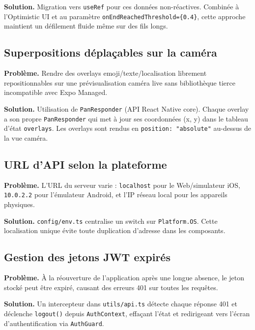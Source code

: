 \textbf{Solution.} Migration vers \texttt{useRef} pour ces données non-réactives. Combinée à l'Optimistic UI et au paramètre \texttt{onEndReachedThreshold=\{0.4\}}, cette approche maintient un défilement fluide même sur des fils longs.

\subsection{Superpositions déplaçables sur la caméra}

\textbf{Problème.} Rendre des overlays emoji/texte/localisation librement repositionnables sur une prévisualisation caméra live sans bibliothèque tierce incompatible avec Expo Managed.

\textbf{Solution.} Utilisation de \texttt{PanResponder} (API React Native core). Chaque overlay a son propre \texttt{PanResponder} qui met à jour ses coordonnées (x, y) dans le tableau d'état \texttt{overlays}. Les overlays sont rendus en \texttt{position: "absolute"} au-dessus de la vue caméra.

\subsection{URL d'API selon la plateforme}

\textbf{Problème.} L'URL du serveur varie : \texttt{localhost} pour le Web/simulateur iOS, \texttt{10.0.2.2} pour l'émulateur Android, et l'IP réseau local pour les appareils physiques.

\textbf{Solution.} \texttt{config/env.ts} centralise un switch sur \texttt{Platform.OS}. Cette localisation unique évite toute duplication d'adresse dans les composants.

\subsection{Gestion des jetons JWT expirés}

\textbf{Problème.} À la réouverture de l'application après une longue absence, le jeton stocké peut être expiré, causant des erreurs 401 sur toutes les requêtes.

\textbf{Solution.} Un intercepteur dans \texttt{utils/api.ts} détecte chaque réponse 401 et déclenche \texttt{logout()} depuis \texttt{AuthContext}, effaçant l'état et redirigeant vers l'écran d'authentification via \texttt{AuthGuard}.
